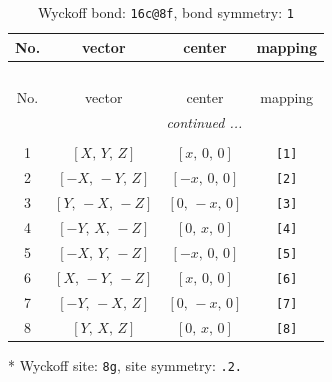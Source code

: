 \documentclass[fleqn,8pt]{jsarticle}
\begin{document}
\renewcommand{\arraystretch}{1.2}
\begin{longtable}{cccc}
\caption{Wyckoff bond: {\tt 16c@8f}, bond symmetry: {\tt 1}}
 \\
 \hline \hline
No. & vector & center & mapping \\ \hline \endfirsthead

\multicolumn{3}{l}{\tablename\ \thetable{}} \\
 \hline \hline
No. & vector & center & mapping \\ \hline \endhead

 \hline \hline
\multicolumn{3}{r}{\footnotesize\it continued ...} \\ \endfoot

 \hline \hline
\multicolumn{3}{r}{} \\ \endlastfoot

1 & $\left[ X,\, Y,\, Z \right]$ & $\left[ x,\, 0,\, 0 \right]$ & {\tt [1]} \\ \hline
2 & $\left[ - X,\, - Y,\, Z \right]$ & $\left[ - x,\, 0,\, 0 \right]$ & {\tt [2]} \\ \hline
3 & $\left[ Y,\, - X,\, - Z \right]$ & $\left[ 0,\, - x,\, 0 \right]$ & {\tt [3]} \\ \hline
4 & $\left[ - Y,\, X,\, - Z \right]$ & $\left[ 0,\, x,\, 0 \right]$ & {\tt [4]} \\ \hline
5 & $\left[ - X,\, Y,\, - Z \right]$ & $\left[ - x,\, 0,\, 0 \right]$ & {\tt [5]} \\ \hline
6 & $\left[ X,\, - Y,\, - Z \right]$ & $\left[ x,\, 0,\, 0 \right]$ & {\tt [6]} \\ \hline
7 & $\left[ - Y,\, - X,\, Z \right]$ & $\left[ 0,\, - x,\, 0 \right]$ & {\tt [7]} \\ \hline
8 & $\left[ Y,\, X,\, Z \right]$ & $\left[ 0,\, x,\, 0 \right]$ & {\tt [8]} \\
\end{longtable}
* Wyckoff site: {\tt 8g}, site symmetry: {\tt .2.}
\renewcommand{\arraystretch}{1.2}
\end{document}
